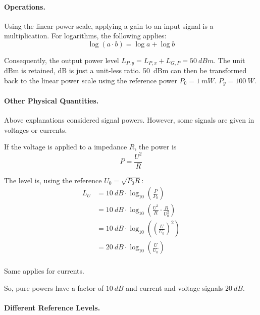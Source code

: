 \begin{refsection}
\paragraph{Operations.}

Using the linear power scale, applying a gain to an input signal is a multiplication. For logarithms, the following applies:
\begin{equation}
	\log \left(a \cdot b\right) = \log a + \log b
\end{equation}

Consequently, the output power level $L_{P,y} = L_{P,x} + L_{G,P} = \SI{50}{dBm}$. The unit \si{dBm} is retained, \si{dB} is just a unit-less ratio. \SI{50}{dBm} can then be transformed back to the linear power scale using the reference power $P_0 = \SI{1}{mW}$. $P_y = \SI{100}{W}$.

\paragraph{Other Physical Quantities.}

Above explanations considered signal powers. However, some signals are given in voltages or currents.

If the voltage is applied to a impedance $R$, the power is
\begin{equation}
	P = \frac{U^2}{R}
\end{equation}

The level is, using the reference $U_0 = \sqrt{P_0 R}$:
\begin{equation}
	\begin{split}
		L_U &= \SI{10}{dB} \cdot \log_{10} \left(\frac{P}{P_0}\right) \\
		 &= \SI{10}{dB} \cdot \log_{10} \left(\frac{U^2}{R} \cdot \frac{R}{U_0^2}\right) \\
		 &= \SI{10}{dB} \cdot \log_{10} \left(\left(\frac{U}{U_0}\right)^2\right) \\
		 &= \SI{20}{dB} \cdot \log_{10} \left(\frac{U}{U_0}\right) \\
	\end{split}
\end{equation}

Same applies for currents.

So, pure powers have a factor of $\SI{10}{dB}$ and current and voltage signals $\SI{20}{dB}$.

\paragraph{Different Reference Levels.}


\end{refsection}

